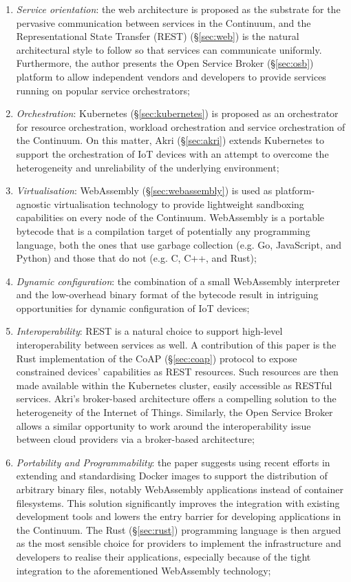 \begin{enumerate}
    \item \emph{Service orientation}: the web architecture is proposed as the substrate for the pervasive communication between services in the Continuum, and the Representational State Transfer (REST) (§\ref{sec:web}) is the natural architectural style to follow so that services can communicate uniformly. Furthermore, the author presents the Open Service Broker (§\ref{sec:osb}) platform to allow independent vendors and developers to provide services running on popular service orchestrators;
    \item \emph{Orchestration}: Kubernetes (§\ref{sec:kubernetes}) is proposed as an orchestrator for resource orchestration, workload orchestration and service orchestration of the Continuum. On this matter, Akri (§\ref{sec:akri}) extends Kubernetes to support the orchestration of IoT devices with an attempt to overcome the heterogeneity and unreliability of the underlying environment;
    \item \emph{Virtualisation}: WebAssembly (§\ref{sec:webassembly}) is used as platform-agnostic virtualisation technology to provide lightweight sandboxing capabilities on every node of the Continuum. WebAssembly is a portable bytecode that is a compilation target of potentially any programming language, both the ones that use garbage collection (e.g. Go, JavaScript, and Python) and those that do not (e.g. C, C++, and Rust);
    \item \emph{Dynamic configuration}: the combination of a small WebAssembly interpreter and the low-overhead binary format of the bytecode result in intriguing opportunities for dynamic configuration of IoT devices;
    \item \emph{Interoperability}: REST is a natural choice to support high-level interoperability between services as well. A contribution of this paper is the Rust implementation of the CoAP (§\ref{sec:coap}) protocol to expose constrained devices' capabilities as REST resources. Such resources are then made available within the Kubernetes cluster, easily accessible as RESTful services. Akri's broker-based architecture offers a compelling solution to the heterogeneity of the Internet of Things. Similarly, the Open Service Broker allows a similar opportunity to work around the interoperability issue between cloud providers via a broker-based architecture;
    \item \emph{Portability and Programmability}: the paper suggests using recent efforts in extending and standardising Docker images to support the distribution of arbitrary binary files, notably WebAssembly applications instead of container filesystems. This solution significantly improves the integration with existing development tools and lowers the entry barrier for developing applications in the Continuum. The Rust (§\ref{sec:rust}) programming language is then argued as the most sensible choice for providers to implement the infrastructure and developers to realise their applications, especially because of the tight integration to the aforementioned WebAssembly technology;
\end{enumerate}

